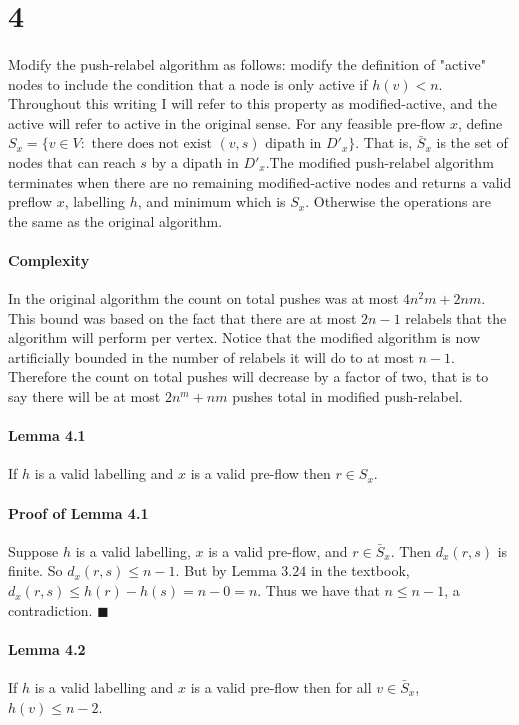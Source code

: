 \documentclass[letterpaper,12pt,oneside,onecolumn]{article}
\begin{document}
\section*{4}
\paragraph{}
Modify the push-relabel algorithm as follows: modify the definition of "active" nodes to include the condition that a node is only active if $h(v) < n$. Throughout this writing I will refer to this property as modified-active, and the active will refer to active in the original sense. For any feasible pre-flow $x$, define $S_x = \{ v \in V: \text{ there does not exist } (v,s) \text{ dipath in } D'_x \}$. That is, $\bar{S}_x$ is the set of nodes that can reach $s$ by a dipath in $D'_x$.The modified push-relabel algorithm terminates when there are no remaining modified-active nodes and returns a valid preflow $x$, labelling $h$, and minimum which is $S_x$. Otherwise the operations are the same as the original algorithm.
\paragraph{Complexity}
 In the original algorithm the count on total pushes was at most $4n^2m + 2nm$. This bound was based on the fact that there are at most $2n-1$ relabels that the algorithm will perform per vertex. Notice that the modified algorithm is now artificially bounded in the number of relabels it will do to at most $n-1$. Therefore the count on total pushes will decrease by a factor of two, that is to say there will be at most $2n^m + nm$ pushes total in modified push-relabel.
\paragraph{Lemma 4.1}
If $h$ is a valid labelling and $x$ is a valid pre-flow then $r \in S_x$.
\paragraph{Proof of Lemma 4.1}
Suppose $h$ is a valid labelling, $x$ is a valid pre-flow, and $r \in \bar{S}_x$. Then $d_x(r,s)$ is finite. So $d_x(r,s) \leq n-1$. But by Lemma $3.24$ in the textbook, $d_x(r,s) \leq h(r) - h(s) = n - 0 = n$. Thus we have that $n \leq n-1$, a contradiction. $\blacksquare$
 \paragraph{Lemma 4.2}
 If $h$ is a valid labelling and $x$ is a valid pre-flow then for all $v \in \bar{S}_x$, $h(v) \leq n-2$.
\end{document}

